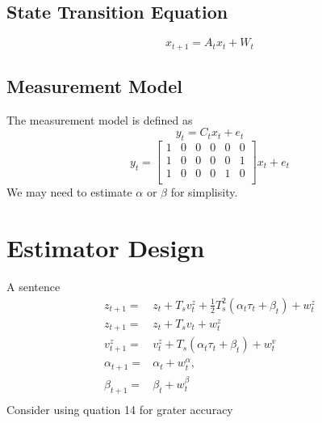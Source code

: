 \documentclass{article}
\begin{document}
\subsection{State Transition Equation}
\begin{equation}
    {x}_{t+1} = A_t {x}_t + W_t
\end{equation}

\subsection{Measurement Model}
The measurement model is defined as
\begin{equation}
y_t = C_t x_t + e_t
\end{equation}
\begin{equation}
    y_t  = 
    \begin{bmatrix}
        1 & 0 & 0 & 0 & 0 & 0 \\
        1 & 0 & 0 & 0 & 0 & 1 \\
        1 & 0 & 0 & 0 & 1 & 0 \\
    \end{bmatrix}
        x_t + e_t
\end{equation}
We may need to estimate \(\alpha\) or \(\beta\) for simplisity.

\section{Estimator Design}
A sentence
\begin{align}
    z_{t+1} =& z_t + T_s v_t^z + \frac{1}{2} T_s^2 (\alpha_t \tau_t + \beta_t) + w_t^z\\
    z_{t+1} =& z_t + {T_s}{v_t} + w^{z}_{t}\\
    v_{t+1}^z =& v_t^z + T_s (\alpha_t \tau_t + \beta_t) + w_t^v\\
    \alpha_{t+1} =& \alpha_t + w_t^\alpha,\\
    \beta_{t+1} =& \beta_t + w_t^\beta\\
\end{align}
Consider using quation 14 for grater accuracy
\end{document}
